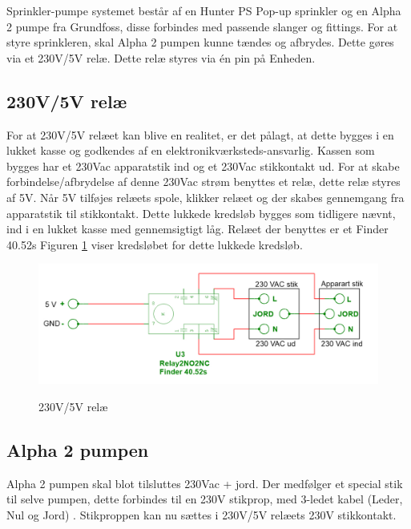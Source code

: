 Sprinkler-pumpe systemet består af en Hunter PS Pop-up sprinkler og en Alpha 2 pumpe fra Grundfoss, disse forbindes med passende slanger og fittings. For at styre sprinkleren, skal Alpha 2 pumpen kunne tændes og afbrydes. Dette gøres via et 230V/5V relæ. Dette relæ styres via én pin på Enheden. 





\subsection{230V/5V relæ}

For at 230V/5V relæet kan blive en realitet, er det pålagt, at dette bygges i en lukket kasse og godkendes af en elektronikværksteds-ansvarlig. Kassen som bygges har et 230Vac apparatstik ind og et 230Vac stikkontakt ud. For at skabe forbindelse/afbrydelse af denne 230Vac strøm benyttes et relæ, dette relæ styres af 5V. Når 5V  tilføjes relæets spole, klikker relæet og der skabes gennemgang fra apparatstik til stikkontakt. Dette lukkede kredsløb bygges som tidligere nævnt, ind i en lukket kasse med gennemsigtigt låg. Relæet der benyttes er et Finder 40.52s Figuren \ref{lab:RELAY} viser kredsløbet for dette lukkede kredsløb.

\begin{figure}[H] \centering
{\includegraphics[width=\textwidth]{filer/design/Billeder/230VAC_KREDS}}
\caption{230V/5V relæ}
\label{lab:RELAY}
\raggedright
\end{figure}

\subsection{Alpha 2 pumpen}

Alpha 2 pumpen skal blot tilsluttes 230Vac + jord. Der medfølger et special stik til selve pumpen, dette forbindes til en 230V stikprop, med 3-ledet kabel (Leder, Nul og Jord) . Stikproppen kan nu sættes i 230V/5V relæets 230V stikkontakt.

